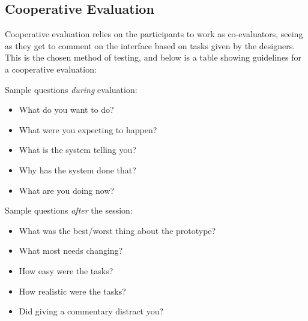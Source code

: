 \subsection{Cooperative Evaluation}
Cooperative evaluation relies on the participants to work as co-evaluators, seeing as they get to comment on the interface based on tasks given by the designers. This is the chosen method of testing, and below is a table showing guidelines for a cooperative evaluation:


Sample questions \textsl{during} evaluation:
\begin{itemize}
	\item What do you want to do?
	\item What were you expecting to happen?
	\item What is the system telling you?
	\item Why has the system done that?
	\item What are you doing now?
\end{itemize}

Sample questions \textsl{after} the session:
\begin{itemize}
	\item What was the best/worst thing about the prototype?
	\item What most needs changing?
	\item How easy were the tasks?
	\item How realistic were the tasks?
	\item Did giving a commentary distract you?
\end{itemize}\cite{Benyon10} 